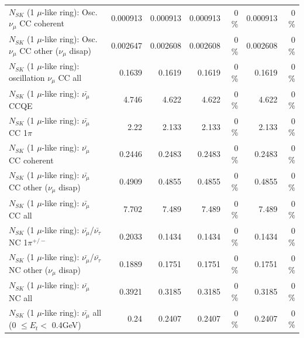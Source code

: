 \begin{table}
\begin{tabular}{| l | r | r | r  r | r  r |}
                        $N_{SK}$ (1 $\mu$-like ring): Osc. $\nu_\mu$ CC coherent &        0.000913 &        0.000913 &        0.000913 &        0 \%  &        0.000913 &        0 \%  \\ 
         $N_{SK}$ (1 $\mu$-like ring): Osc. $\nu_\mu$ CC other ($\nu_\mu$ disap) &        0.002647 &        0.002608 &        0.002608 &        0 \%  &        0.002608 &        0 \%  \\ 
                      $N_{SK}$ (1 $\mu$-like ring): oscillation $\nu_\mu$ CC all &          0.1639 &          0.1619 &          0.1619 &        0 \%  &          0.1619 &        0 \%  \\ 
\hline
\hline
                              $N_{SK}$ (1 $\mu$-like ring): $\bar{\nu_\mu}$ CCQE &           4.746 &           4.622 &           4.622 &        0 \%  &           4.622 &        0 \%  \\ 
                         $N_{SK}$ (1 $\mu$-like ring): $\bar{\nu_\mu}$ CC 1$\pi$ &            2.22 &           2.133 &           2.133 &        0 \%  &           2.133 &        0 \%  \\ 
                       $N_{SK}$ (1 $\mu$-like ring): $\bar{\nu_\mu}$ CC coherent &          0.2446 &          0.2483 &          0.2483 &        0 \%  &          0.2483 &        0 \%  \\ 
        $N_{SK}$ (1 $\mu$-like ring): $\bar{\nu_\mu}$ CC other ($\nu_\mu$ disap) &          0.4909 &          0.4855 &          0.4855 &        0 \%  &          0.4855 &        0 \%  \\ 
                          $N_{SK}$ (1 $\mu$-like ring): $\bar{\nu_{\mu}}$ CC all &           7.702 &           7.489 &           7.489 &        0 \%  &           7.489 &        0 \%  \\ 
\hline
  $N_{SK}$ (1 $\mu$-like ring): $\bar{\nu_\mu}$/$\bar{\nu_\tau}$ NC 1$\pi^{+/-}$ &          0.2033 &          0.1434 &          0.1434 &        0 \%  &          0.1434 &        0 \%  \\ 
$N_{SK}$ (1 $\mu$-like ring): $\bar{\nu_\mu}$/$\bar{\nu_\tau}$ NC other ($\nu_\mu$ disap) &          0.1889 &          0.1751 &          0.1751 &        0 \%  &          0.1751 &        0 \%  \\ 
                          $N_{SK}$ (1 $\mu$-like ring): $\bar{\nu_{\mu}}$ NC all &          0.3921 &          0.3185 &          0.3185 &        0 \%  &          0.3185 &        0 \%  \\ 
\hline
   $N_{SK}$ (1 $\mu$-like ring): $\bar{\nu_{\mu}}$ all (0 $\leq E_{t} <$ 0.4GeV) &            0.24 &          0.2407 &          0.2407 &        0 \%  &          0.2407 &        0 \%  \\ 

\end{tabular}
\end{table}
